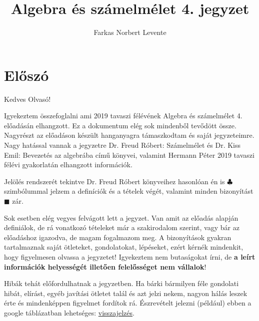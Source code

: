 \documentclass[12pt]{book}
\theoremstyle{plain} %
\theoremstyle{definition} %
\theoremstyle{remark}
\numberwithin{equation}{section}  %
\begin{document}
	
	\author{Farkas Norbert Levente}
	\title{Algebra és számelmélet 4. jegyzet}
	\maketitle
	\tableofcontents
	\newpage
	
	\renewcommand{\chaptername}{előadás}
	
	\section*{Előszó}
	\pagestyle{empty}
	Kedves Olvasó!
	
	Igyekeztem összefoglalni ami 2019 tavaszi félévének Algebra és számelmélet 4. előadásán elhangzott. Ez a dokumentum elég sok mindenből tevődött össze. Nagyrészt az előadáson készült hanganyagra támaszkodtam és saját jegyzeteimre. Nagy hatással vannak a jegyzetre Dr. Freud Róbert: Számelmélet és Dr. Kiss Emil: Bevezetés az algebrába című könyvei, valamint Hermann Péter 2019 tavaszi félévi gyakorlatán elhangzott információk.
	
	Jelölés rendszerét tekintve Dr. Freud Róbert könyveihez hasonlóan én is $\clubsuit$ szimbólummal jelzem a definíciók és a tételek végét, valamint minden bizonyítást $\blacksquare$ zár.
	
	Sok esetben elég vegyes felvágott lett a jegyzet. Van amit az előadás alapján definiálok, de rá vonatkozó tételeket már a szakirodalom szerint, vagy bár az előadáshoz igazodva, de magam fogalmazom meg. A bizonyítások gyakran tartalmaznak saját ötleteket, gondolatokat, lépéseket, ezért kérnék mindenkit, hogy figyelmesen olvassa a jegyzetet! Igyekeztem nem butaságokat írni, de \textbf{a leírt információk helyességét illetően felelősséget nem vállalok}!
	
	
	Hibák tehát előfordulhatnak a jegyzetben. Ha bárki bármilyen féle gondolati hibát, elírást, egyéb javítási ötletet talál és azt jelzi nekem, nagyon hálás leszek érte és mindenképpen figyelmet fordítok rá. Észrevételt jelezni (például) ebben a google táblázatban lehetséges:  \href{https://docs.google.com/spreadsheets/d/1be-alObB5R-k0JgOGCSRH83mbiVcythq--f85ti3RgA/edit#gid=0}{visszajelzés}.
	
\end{document}
